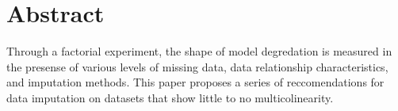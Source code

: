 \documentclass[../paper.tex]{subfiles}
\begin{document}
\section{Abstract}

Through a factorial experiment, the shape of model degredation is measured
in the presense of various levels of missing data, data relationship
characteristics, and imputation methods.
This paper proposes a series of reccomendations for data imputation on datasets
that show little to no multicolinearity.
\end{document}
